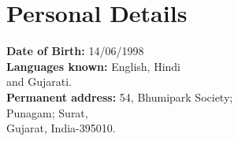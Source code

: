 \documentclass[]{jaydeep-resume-openfont}
\begin{document}
\begin{minipage}[t]{0.29\textwidth}

\section{Personal Details}
\textbullet{} \textbf{Date of Birth:} 14/06/1998 \\
\textbullet{} \textbf{Languages known:} English, Hindi\\ and Gujarati.\\
\textbullet{} \textbf{Permanent address:} 54, Bhumipark Society;\\  Punagam; Surat,\\ Gujarat, India-395010.
\sectionsep

%
%

\end{minipage}
\hfill
\end{document}
